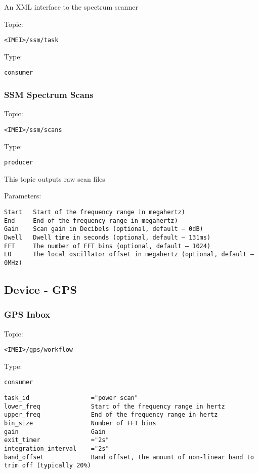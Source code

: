 An XML interface to the spectrum scanner
    
Topic:
\begin{lstlisting}<IMEI>/ssm/task\end{lstlisting}
Type:
\begin{lstlisting}consumer\end{lstlisting}

\subsubsection{SSM Spectrum Scans}

Topic:
\begin{lstlisting}<IMEI>/ssm/scans\end{lstlisting}
Type:
\begin{lstlisting}producer\end{lstlisting}
    
This topic outputs raw scan files

Parameters:
\begin{lstlisting}
Start   Start of the frequency range in megahertz)
End     End of the frequency range in megahertz)
Gain    Scan gain in Decibels (optional, default – 0dB)
Dwell   Dwell time in seconds (optional, default – 131ms)
FFT     The number of FFT bins (optional, default – 1024)
LO      The local oscillator offset in megahertz (optional, default – 0MHz)
\end{lstlisting}


\subsection{Device - GPS}
\subsubsection{GPS Inbox}

Topic:
\begin{lstlisting}<IMEI>/gps/workflow\end{lstlisting}
Type:
\begin{lstlisting}consumer\end{lstlisting}


\begin{lstlisting}
task_id                 ="power scan"
lower_freq              Start of the frequency range in hertz
upper_freq              End of the frequency range in hertz
bin_size                Number of FFT bins
gain                    Gain
exit_timer              ="2s"
integration_interval    ="2s"
band_offset             Band offset, the amount of non-linear band to trim off (typically 20%)
\end{lstlisting}


